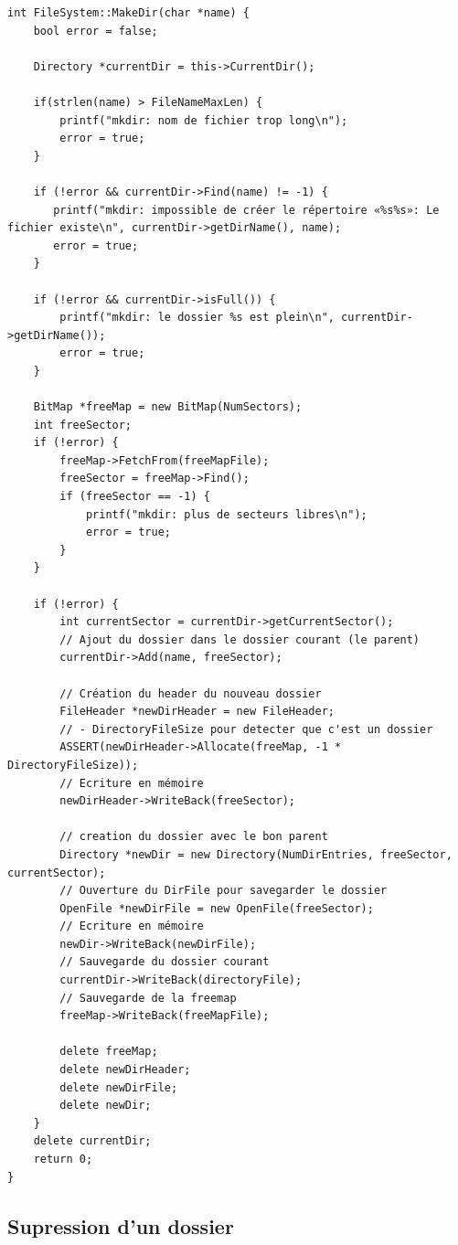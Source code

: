 \documentclass[a4paper,10pt]{article}
\begin{document}
\begin{lstlisting}
int FileSystem::MakeDir(char *name) {
    bool error = false;

    Directory *currentDir = this->CurrentDir();

    if(strlen(name) > FileNameMaxLen) {
        printf("mkdir: nom de fichier trop long\n");
        error = true;
    }

    if (!error && currentDir->Find(name) != -1) {
       printf("mkdir: impossible de créer le répertoire «%s%s»: Le fichier existe\n", currentDir->getDirName(), name);
       error = true;
    }

    if (!error && currentDir->isFull()) {
        printf("mkdir: le dossier %s est plein\n", currentDir->getDirName());
        error = true;
    }

    BitMap *freeMap = new BitMap(NumSectors);
    int freeSector;
    if (!error) {
        freeMap->FetchFrom(freeMapFile);
        freeSector = freeMap->Find();
        if (freeSector == -1) {
            printf("mkdir: plus de secteurs libres\n");
            error = true;
        }
    }

    if (!error) {
        int currentSector = currentDir->getCurrentSector();
        // Ajout du dossier dans le dossier courant (le parent)
        currentDir->Add(name, freeSector);

        // Création du header du nouveau dossier
        FileHeader *newDirHeader = new FileHeader;
        // - DirectoryFileSize pour detecter que c'est un dossier
        ASSERT(newDirHeader->Allocate(freeMap, -1 * DirectoryFileSize));
        // Ecriture en mémoire
        newDirHeader->WriteBack(freeSector);

        // creation du dossier avec le bon parent
        Directory *newDir = new Directory(NumDirEntries, freeSector, currentSector);
        // Ouverture du DirFile pour savegarder le dossier
        OpenFile *newDirFile = new OpenFile(freeSector);
        // Ecriture en mémoire
        newDir->WriteBack(newDirFile);
        // Sauvegarde du dossier courant
        currentDir->WriteBack(directoryFile);
        // Sauvegarde de la freemap
        freeMap->WriteBack(freeMapFile);

        delete freeMap;
        delete newDirHeader;
        delete newDirFile;
        delete newDir;
    }
    delete currentDir;
    return 0;
}
\end{lstlisting}

\subsection{Supression d'un dossier}
\end{document}
